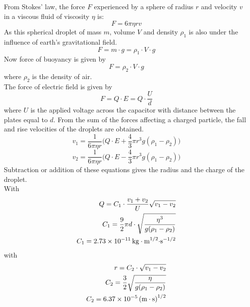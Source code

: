 \documentclass[%
 reprint,
 amsmath,amssymb,
 aps,
]{revtex4-2}
\begin{document}
    \par
    From Stokes' law, the force $F$ experienced by a sphere of radius $r$ and velocity $v$ in a viscous fluid of viscosity $\eta$ is:
    \begin{equation}
    \label{stokes}
        F = 6 \pi \eta r v
    \end{equation}
    As this spherical droplet of mass $m$, volume $V$ and density $\rho_1$ is also under the influence of earth's gravitational field.
    \begin{equation}
        F =  m \cdot g = \rho_1 \cdot V \cdot g
    \end{equation}
    Now force of buoyancy is given by
    \begin{equation}
        F = \rho_2 \cdot V \cdot g
    \end{equation}
    where $\rho_2$ is the density of air.\\
    The force of electric field is given by
    \begin{equation}
        F = Q \cdot E = Q \cdot \dfrac{U}{d}
    \end{equation}
    where $U$ is the applied voltage across the capacitor with distance between the plates equal to $d$.
    From the sum of the forces affecting a charged particle, the fall and rise velocities of the droplets are obtained.
    \begin{equation}
        v_1 = \dfrac{1}{6 \pi \eta r} \Bigg (Q \cdot E + \dfrac{4}{3} \pi r^3 g (\rho_1 - \rho_2) \Bigg)
    \end{equation}
    \begin{equation}
        v_2 = \dfrac{1}{6 \pi \eta r} \Bigg (Q \cdot E - \dfrac{4}{3} \pi r^3 g (\rho_1 - \rho_2) \Bigg)
    \end{equation}
    Subtraction or addition of these equations gives the radius and the charge of the droplet.\\
    With
    \begin{equation}
        \begin{aligned}
            Q = C_1 \cdot \dfrac{v_1 + v_2}{U}\sqrt{v_1 - v_2} \\
            C_1 = \dfrac{9}{2} \pi d \cdot \sqrt{\dfrac{\eta^3}{g (\rho_1 - \rho_2)}} \\
            C_1 = \SI{2.73e-11}{\kg \cdot \raiseto{1/2} \metre \cdot \raiseto{-1/2} \second}
        \end{aligned}
    \end{equation}
    with
    \begin{equation}
        \begin{aligned}[t]
            r = C_2 \cdot \sqrt{v_1 - v_2} \\
            C_2 = \dfrac{3}{2} \sqrt{\dfrac{\eta}{g (\rho_1 - \rho_2)}} \\
            C_2 = \SI{6.37e-5}{\raiseto{1/2} {(\metre \cdot \second)}}
        \end{aligned}
    \end{equation}
    
\end{document}
